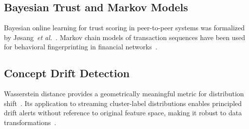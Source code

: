 \documentclass[journal]{IEEEtran}
\begin{document}
\subsection{Bayesian Trust and Markov Models}
Bayesian online learning for trust scoring in peer-to-peer systems
was formalized by Jøsang~\emph{et al.}~\cite{Josang2002}.
Markov chain models of transaction sequences have been used for
behavioral fingerprinting in financial networks~\cite{Akcora2022}.

\subsection{Concept Drift Detection}
Wasserstein distance provides a geometrically meaningful metric for
distribution shift~\cite{Villani2009}.
Its application to streaming cluster-label distributions enables
principled drift alerts without reference to original feature space,
making it robust to data transformations~\cite{Lu2018}.












\end{document}
